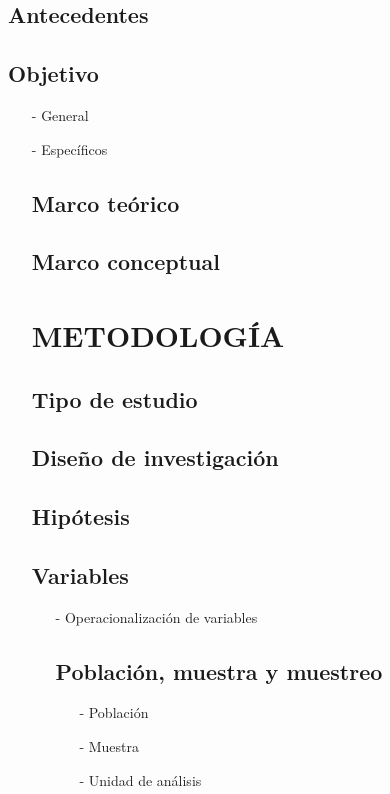 \documentclass{report}
\begin{document}
\subsection{Antecedentes}
\subsection{Objetivo}
\begin{enumerate}
\item[-] General
\item[-] Específicos
\begin{enumerate}
\subsection{Marco teórico}
\subsection{Marco conceptual}

\section{METODOLOGÍA}
\subsection{Tipo de estudio}
\subsection{Diseño de investigación}
\subsection{Hipótesis}
\subsection{Variables}
\begin{enumerate}
\item[-] Operacionalización de variables
\begin{enumerate}
\subsection{Población, muestra y muestreo}
\begin{enumerate}
\item[-] Población
\item[-] Muestra
\item[-] Unidad de análisis
\begin{enumerate}

\end{enumerate}
\end{enumerate}
\end{enumerate}
\end{enumerate}
\end{enumerate}
\end{enumerate}
\end{document}
